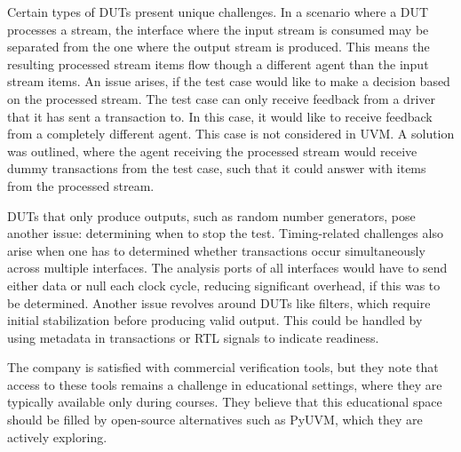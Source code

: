 \documentclass[12pt]{book}
\begin{document}
Certain types of DUTs present unique challenges. In a scenario where a DUT processes a stream, the interface where the input stream is consumed may be separated from the one where the output stream is produced. This means the resulting processed stream items flow though a different agent than the input stream items. An issue arises, if the test case would like to make a decision based on the processed stream. The test case can only receive feedback from a driver that it has sent a transaction to. In this case, it would like to receive feedback from a completely different agent. This case is not considered in UVM. A solution was outlined, where the agent receiving the processed stream would receive dummy transactions from the test case, such that it could answer with items from the processed stream. 

DUTs that only produce outputs, such as random number generators, pose another issue: determining when to stop the test. Timing-related challenges also arise when one has to determined whether transactions occur simultaneously across multiple interfaces. The analysis ports of all interfaces would have to send either data or null each clock cycle, reducing significant overhead, if this was to be determined. Another issue revolves around DUTs like filters, which require initial stabilization before producing valid output. This could be handled by using metadata in transactions or RTL signals to indicate readiness.

The company is satisfied with commercial verification tools, but they note that access to these tools remains a challenge in educational settings, where they are typically available only during courses. They believe that this educational space should be filled by open-source alternatives such as PyUVM, which they are actively exploring.
\end{document}
